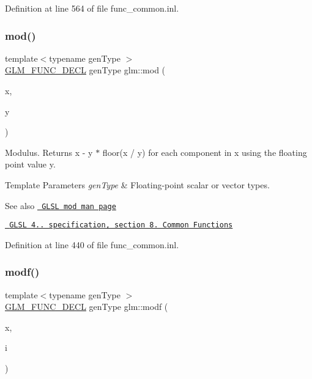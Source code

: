 Definition at line 564 of file func\+\_\+common.\+inl.

\mbox{\label{group__core__func__common_ga12201563ef902e3b07e0d1d7656efdb1}} 
\subsubsection{\texorpdfstring{mod()}{mod()}}
{\footnotesize\ttfamily template$<$typename gen\+Type $>$ \\
\mbox{\hyperlink{setup_8hpp_ab2d052de21a70539923e9bcbf6e83a51}{G\+L\+M\+\_\+\+F\+U\+N\+C\+\_\+\+D\+E\+CL}} gen\+Type glm\+::mod (\begin{DoxyParamCaption}\item[{gen\+Type}]{x,  }\item[{gen\+Type}]{y }\end{DoxyParamCaption})}

Modulus. Returns x -\/ y $\ast$ floor(x / y) for each component in x using the floating point value y.


\begin{DoxyTemplParams}{Template Parameters}
{\em gen\+Type} & Floating-\/point scalar or vector types.\\
\hline
\end{DoxyTemplParams}
\begin{DoxySeeAlso}{See also}
\href{http://www.opengl.org/sdk/docs/manglsl/xhtml/mod.xml}{\texttt{ G\+L\+SL mod man page}} 

\href{http://www.opengl.org/registry/doc/GLSLangSpec.4.20.8.pdf}{\texttt{ G\+L\+SL 4.. specification, section 8. Common Functions}} 
\end{DoxySeeAlso}


Definition at line 440 of file func\+\_\+common.\+inl.

\mbox{\label{group__core__func__common_ga85e33f139b8db1b39b590a5713b9e679}} 
\subsubsection{\texorpdfstring{modf()}{modf()}}
{\footnotesize\ttfamily template$<$typename gen\+Type $>$ \\
\mbox{\hyperlink{setup_8hpp_ab2d052de21a70539923e9bcbf6e83a51}{G\+L\+M\+\_\+\+F\+U\+N\+C\+\_\+\+D\+E\+CL}} gen\+Type glm\+::modf (\begin{DoxyParamCaption}\item[{gen\+Type}]{x,  }\item[{gen\+Type \&}]{i }\end{DoxyParamCaption})}

